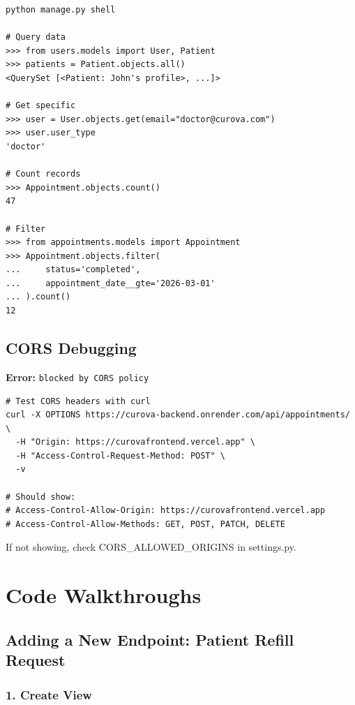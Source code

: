 \documentclass[11pt,a4paper,twoside]{report}
\begin{document}
\begin{lstlisting}
python manage.py shell

# Query data
>>> from users.models import User, Patient
>>> patients = Patient.objects.all()
<QuerySet [<Patient: John's profile>, ...]>

# Get specific
>>> user = User.objects.get(email="doctor@curova.com")
>>> user.user_type
'doctor'

# Count records
>>> Appointment.objects.count()
47

# Filter
>>> from appointments.models import Appointment  
>>> Appointment.objects.filter(
...     status='completed',
...     appointment_date__gte='2026-03-01'
... ).count()
12
\end{lstlisting}

\section{CORS Debugging}

\textbf{Error:} \texttt{blocked by CORS policy}

\begin{lstlisting}
# Test CORS headers with curl
curl -X OPTIONS https://curova-backend.onrender.com/api/appointments/ \
  -H "Origin: https://curovafrontend.vercel.app" \
  -H "Access-Control-Request-Method: POST" \
  -v

# Should show:
# Access-Control-Allow-Origin: https://curovafrontend.vercel.app
# Access-Control-Allow-Methods: GET, POST, PATCH, DELETE
\end{lstlisting}

If not showing, check CORS\_ALLOWED\_ORIGINS in settings.py.

\newpage

\chapter{Code Walkthroughs}

\section{Adding a New Endpoint: Patient Refill Request}

\subsection{1. Create View}
\end{document}
